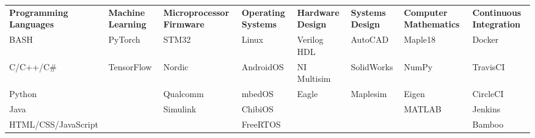 
\begin{cvparagraph}

\begin{center}
  \begin{tabular}{L L L L L L L L}
  \textbf{Programming Languages} & \textbf{Machine Learning} & \textbf{Microprocessor Firmware} & \textbf{Operating Systems} & \textbf{Hardware Design} & \textbf{Systems Design} & \textbf{Computer Mathematics} & \textbf{Continuous Integration} \\
  BASH                 & PyTorch    & STM32    & Linux     & Verilog HDL & AutoCAD    & Maple18 & Docker   \\
  C/C++/C\#            & TensorFlow & Nordic   & AndroidOS & NI Multisim & SolidWorks & NumPy   & TravisCI \\
  Python               &            & Qualcomm & mbedOS    & Eagle       & Maplesim   & Eigen   & CircleCI \\
  Java                 &            & Simulink & ChibiOS   &             &            & MATLAB  & Jenkins  \\
  HTML/CSS/JavaScript  &            &          & FreeRTOS  &             &            &         & Bamboo   \\
  \end{tabular}
\end{center}


\end{cvparagraph}
